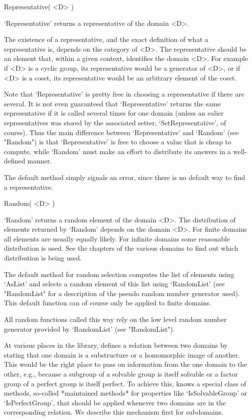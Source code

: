 \>Representative( <D> )

`Representative' returns a representative of the domain <D>.

The existence of  a representative, and the exact  definition of  what  a
representative  is, depends on the category  of  <D>.  The representative
should be an  element that, within a given context, identifies the domain
<D>.  For example if <D> is a cyclic group, its representative would be a
generator of <D>, or if <D> is  a  coset, its representative  would be an
arbitrary element of the coset.

Note that `Representative' is pretty free in choosing a representative if
there are  several.   It is  not even  guaranteed   that `Representative'
returns the same  representative if it  is  called several times for  one
domain (unless an  ealier  representatives was stored by  the  associated
setter, `SetRepresentative', of course). Thus the main difference between
`Representative' and `Random'  (see "Random") is that `Representative' is
free to choose a value that is cheap to compute, while `Random' must make
an effort to distribute its answers in a well-defined manner.

The default method simply signals an error, since there is no default way
to find a representative.

\>Random( <D> )

`Random' returns a random element of the domain <D>.  The distribution of
elements returned  by `Random'  depends on  the domain  <D>.  For  finite
domains all  elements are usually  equally likely.   For infinite domains
some reasonable  distribution is used.  See the   chapters of the various
domains to find out which distribution is being used.

The  default method for random   selection computes the list of  elements
using   `AsList' and  selects  a   random  element  of   this list  using
`RandomList'  (see "RandomList" for  a  description of the  pseudo random
number generator  used).  This default function  can  of course  only  be
applied to finite domains.

All random functions called this way rely on  the low level random number
generator provided by `RandomList' (see "RandomList").


At various  places in the library,  {\GAP} defines a relation between two
domains by stating  that one  domain  is a substructure  or a homomorphic
image of another.  This would be  the right place  to pass on information
from the one domain to the other, e.g., because  a subgroup of a solvable
group is itself solvable or  a factor group of  a perfect group is itself
perfect. To  achieve  this, {\GAP}  knows a   special class  of  methods,
so-called *maintained  methods* for properties  like `IsSolvableGroup' or
`IsPerfectGroup', that should be applied whenever two  domains are in the
corresponding relation. We describe this mechanism first for subdomains.

